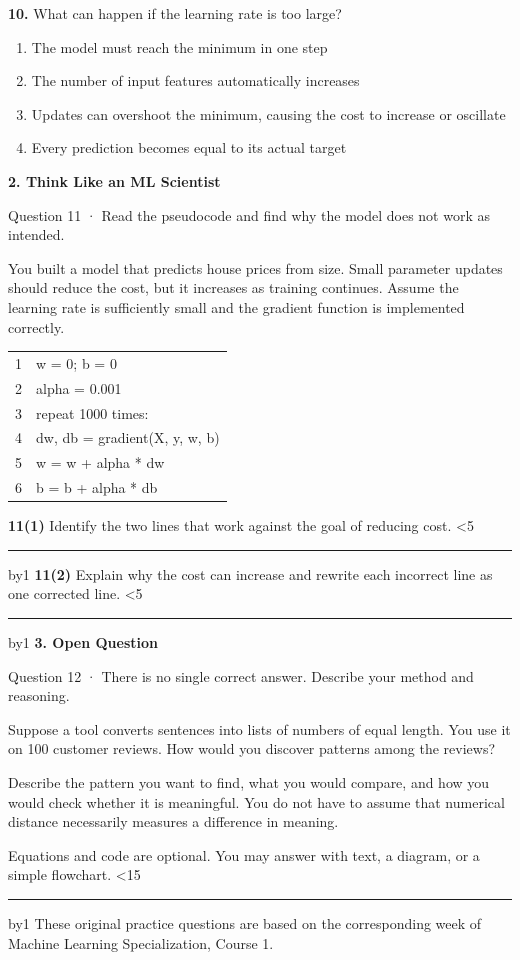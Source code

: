 \documentclass[11pt,a4paper]{article}
\newcommand{\parttitle}[2]{{\large\bfseries\color{ink} #1}\par{\small #2}\par\vspace{5mm}}
\newcommand{\question}[2]{\textbf{#1.} #2\par}
\newcommand{\answerlines}[1]{\foreachline{#1}}
\newcommand{\foreachline}[1]{\linecount=0\loop\ifnum\linecount<#1\vspace{8mm}\par{\color{rulegray}\hrule}\advance\linecount by1\repeat}
\begin{document}
\question{10}{What can happen if the learning rate is too large?}
\begin{enumerate}[label=(\arabic*),leftmargin=9mm,itemsep=0pt,topsep=2pt,parsep=0pt]
\item The model must reach the minimum in one step
\item The number of input features automatically increases
\item Updates can overshoot the minimum, causing the cost to increase or oscillate
\item Every prediction becomes equal to its actual target
\end{enumerate}\vfill
\newpage
\parttitle{2. Think Like an ML Scientist}{Question 11 · Read the pseudocode and find why the model does not work as intended.}
You built a model that predicts house prices from size. Small parameter updates should reduce the cost, but it increases as training continues. Assume the learning rate is sufficiently small and the gradient function is implemented correctly.
\par\vspace{3mm}
{\small\ttfamily\begin{tabular}{r l}
1 & \hspace*{0.0mm}w = 0; b = 0 \\
2 & \hspace*{0.0mm}alpha = 0.001 \\
3 & \hspace*{0.0mm}repeat 1000 times: \\
4 & \hspace*{6.0mm}dw, db = gradient(X, y, w, b) \\
5 & \hspace*{6.0mm}w = w + alpha * dw \\
6 & \hspace*{6.0mm}b = b + alpha * db \\
\end{tabular}}\par\vspace{5mm}
\textbf{11(1)} Identify the two lines that work against the goal of reducing cost.
\answerlines{5}
\vspace{6mm}
\textbf{11(2)} Explain why the cost can increase and rewrite each incorrect line as one corrected line.
\answerlines{5}
\vspace{6mm}
\newpage
\parttitle{3. Open Question}{Question 12 · There is no single correct answer. Describe your method and reasoning.}
Suppose a tool converts sentences into lists of numbers of equal length. You use it on 100 customer reviews. How would you discover patterns among the reviews?
\par\vspace{3mm}
Describe the pattern you want to find, what you would compare, and how you would check whether it is meaningful. You do not have to assume that numerical distance necessarily measures a difference in meaning.
\par\vspace{3mm}
{\small Equations and code are optional. You may answer with text, a diagram, or a simple flowchart.}
\answerlines{15}
\vfill{\footnotesize These original practice questions are based on the corresponding week of Machine Learning Specialization, Course 1.}
\end{document}
